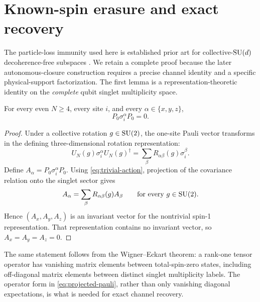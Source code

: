 \section{Known-spin erasure and exact recovery}
\label{sec:erasure}

The particle-loss immunity used here is established prior art for collective-$\mathrm{SU}(d)$ decoherence-free subspaces \cite{MigdalBanaszek2011}.  We retain a complete proof because the later autonomous-closure construction requires a precise channel identity and a specific physical-support factorization.  The first lemma is a representation-theoretic identity on the \emph{complete} qubit singlet multiplicity space.

\begin{lemma}
\label{lem:projected-pauli}
For every even $N\ge4$, every site $i$, and every $\alpha\in\{x,y,z\}$,
\begin{equation}
  P_0\sigma_i^\alpha P_0=0.
  \label{eq:projected-pauli}
\end{equation}
\end{lemma}

\begin{proof}
Under a collective rotation $g\in\mathrm{SU}(2)$, the one-site Pauli vector transforms in the defining three-dimensional rotation representation:
\begin{equation}
  U_N(g)\sigma_i^\alpha U_N(g)^\dagger
  =\sum_{\beta}R_{\alpha\beta}(g)\sigma_i^\beta.
\end{equation}
Define $A_\alpha=P_0\sigma_i^\alpha P_0$.  Using \cref{eq:trivial-action}, projection of the covariance relation onto the singlet sector gives
\begin{equation}
  A_\alpha
  =\sum_\beta R_{\alpha\beta}(g)A_\beta
  \qquad\text{for every }g\in\mathrm{SU}(2).
\end{equation}
Hence $(A_x,A_y,A_z)$ is an invariant vector for the nontrivial spin-1 representation.  That representation contains no invariant vector, so $A_x=A_y=A_z=0$.
\end{proof}

The same statement follows from the Wigner--Eckart theorem: a rank-one tensor operator has vanishing matrix elements between total-spin-zero states, including off-diagonal matrix elements between distinct singlet multiplicity labels.  The operator form in \cref{eq:projected-pauli}, rather than only vanishing diagonal expectations, is what is needed for exact channel recovery.


